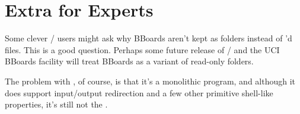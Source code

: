 \section{Extra for Experts}
Some clever \MH/ users might ask why BBoards aren't kept as folders instead
of 'd files.
This is a good question.
Perhaps some future release of \MH/ and the UCI BBoards facility will treat
BBoards as a variant of read-only folders.

The problem with , of course, is that it's a monolithic program,
and although it does support input/output redirection and a few other
primitive shell-like properties, it's still not the .
